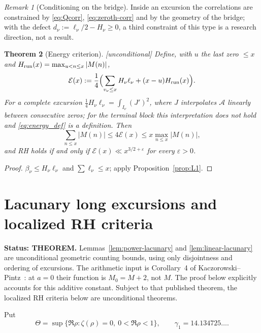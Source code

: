 \documentclass[11pt]{amsart}
\numberwithin{equation}{section}
\theoremstyle{plain}
\newtheorem{theorem}{Theorem}[section]
\theoremstyle{definition}
\theoremstyle{remark}
\newtheorem{remark}[theorem]{Remark}
\newcommand{\Anet}{\mathcal{A}}
\newcommand{\eps}{\varepsilon}
\newcommand{\En}{\mathcal{E}}
\begin{document}
\begin{remark}[Conditioning on the bridge]
\label{rem:conditioning}
Inside an excursion the correlations are constrained by
\eqref{eq:Qcorr}, \eqref{eq:zeroth-corr} and by the geometry of the bridge;
with the defect $d_\nu:=\ell_\nu/2-H_\nu\ge0$, a third constraint of this
type is a research direction, not a result.
\end{remark}

\begin{theorem}[Energy criterion]
\label{thm:energy}
\emph{[unconditional]} Define, with $u$ the last zero $\le x$ and
$H_{\rm run}(x)=\max_{u<n\le x}|M(n)|$,
\begin{equation}
\label{eq:energy_def}
  \En(x):=\frac14\Bigl(\sum_{v_\nu\le x}H_\nu\ell_\nu+(x-u)H_{\rm run}(x)\Bigr).
\end{equation}
For a complete excursion $\tfrac14H_\nu\ell_\nu=\int_{I_\nu}(J')^2$, where
$J$ interpolates $\Anet$ linearly between consecutive zeros; for the
terminal block this interpretation does not hold and \eqref{eq:energy_def} is
a definition. Then
\begin{equation}
\label{eq:energy_sandwich}
  \sum_{n\le x}|M(n)|\le4\En(x)\le x\max_{n\le x}|M(n)|,
\end{equation}
and RH holds if and only if $\En(x)\ll x^{3/2+\eps}$ for every $\eps>0$.
\end{theorem}

\begin{proof}
$\beta_\nu\le H_\nu\ell_\nu$ and $\sum\ell_\nu\le x$; apply
Proposition~\ref{prop:L1}.
\end{proof}


\section{Lacunary long excursions and localized RH criteria}
\label{sec:lacunary}

\noindent\textbf{Status: THEOREM.} Lemmas~\ref{lem:power-lacunary} and
\ref{lem:linear-lacunary} are unconditional geometric counting bounds,
using only disjointness and ordering of excursions. The arithmetic input is
Corollary~4 of Kaczorowski--Pintz~\cite{KP86}: at $a=0$ their function is
$M_0=M+2$, not $M$. The proof below explicitly accounts for this additive
constant. Subject to that published theorem, the localized RH criteria below
are unconditional theorems.

Put
\[
\Theta=\sup\{\Re\rho:\zeta(\rho)=0,\ 0<\Re\rho<1\},\qquad
\gamma_1=14.134725\ldots .
\]
\end{document}
